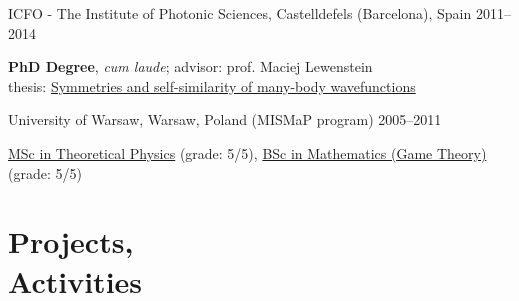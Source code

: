 \documentclass[margin,line]{resume}
\begin{document}
\begin{resume}
    ICFO - The Institute of Photonic Sciences,  Castelldefels (Barcelona), Spain \hfill { 2011--2014}\\
   \begin{list2}
        \vspace*{-4mm}
        \item \textbf{PhD Degree}, \emph{cum laude}; advisor: prof. Maciej Lewenstein\\
            thesis: \href{http://arxiv.org/abs/1412.6796}{Symmetries and self-similarity of many-body wavefunctions}
    \end{list2}
    \vspace*{-4mm}
    University of Warsaw, Warsaw, Poland (MISMaP program) \hfill { 2005--2011}\\
    \begin{list2}
      \vspace*{-4mm}
      \item \href{http://migdal.wikidot.com/en:collective-decoherence}{MSc in Theoretical Physics} (grade: 5/5),
      \href{http://migdal.wikidot.com/en:mafia}{BSc in Mathematics (Game Theory)} (grade: 5/5)
    \end{list2}


    \section{\mysidestyle Projects,\\Activities}


\end{resume}
\end{document}
